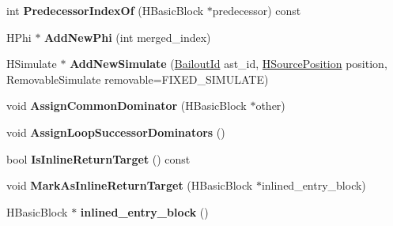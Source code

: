 \begin{DoxyCompactItemize}
\item 
\hypertarget{classv8_1_1internal_1_1_v8___f_i_n_a_l_a4f5134aa9350a6841e19f171be1e6ca8}{}int {\bfseries Predecessor\+Index\+Of} (H\+Basic\+Block $\ast$predecessor) const \label{classv8_1_1internal_1_1_v8___f_i_n_a_l_a4f5134aa9350a6841e19f171be1e6ca8}

\item 
\hypertarget{classv8_1_1internal_1_1_v8___f_i_n_a_l_af81fe6c97041542b981579512b971100}{}H\+Phi $\ast$ {\bfseries Add\+New\+Phi} (int merged\+\_\+index)\label{classv8_1_1internal_1_1_v8___f_i_n_a_l_af81fe6c97041542b981579512b971100}

\item 
\hypertarget{classv8_1_1internal_1_1_v8___f_i_n_a_l_ad925e7346eb735576ccc8fedcc2bef35}{}H\+Simulate $\ast$ {\bfseries Add\+New\+Simulate} (\hyperlink{classv8_1_1internal_1_1_bailout_id}{Bailout\+Id} ast\+\_\+id, \hyperlink{classv8_1_1internal_1_1_h_source_position}{H\+Source\+Position} position, Removable\+Simulate removable=F\+I\+X\+E\+D\+\_\+\+S\+I\+M\+U\+L\+A\+T\+E)\label{classv8_1_1internal_1_1_v8___f_i_n_a_l_ad925e7346eb735576ccc8fedcc2bef35}

\item 
\hypertarget{classv8_1_1internal_1_1_v8___f_i_n_a_l_a71ee21eef9a12ae9cda1b6dde976fbfa}{}void {\bfseries Assign\+Common\+Dominator} (H\+Basic\+Block $\ast$other)\label{classv8_1_1internal_1_1_v8___f_i_n_a_l_a71ee21eef9a12ae9cda1b6dde976fbfa}

\item 
\hypertarget{classv8_1_1internal_1_1_v8___f_i_n_a_l_acee0282e46e01abbd69e3ff379f039e4}{}void {\bfseries Assign\+Loop\+Successor\+Dominators} ()\label{classv8_1_1internal_1_1_v8___f_i_n_a_l_acee0282e46e01abbd69e3ff379f039e4}

\item 
\hypertarget{classv8_1_1internal_1_1_v8___f_i_n_a_l_a23e48a1a11936105ef38f10b3b22e42b}{}bool {\bfseries Is\+Inline\+Return\+Target} () const \label{classv8_1_1internal_1_1_v8___f_i_n_a_l_a23e48a1a11936105ef38f10b3b22e42b}

\item 
\hypertarget{classv8_1_1internal_1_1_v8___f_i_n_a_l_ad6116171a7340d8885d1cb361acc3378}{}void {\bfseries Mark\+As\+Inline\+Return\+Target} (H\+Basic\+Block $\ast$inlined\+\_\+entry\+\_\+block)\label{classv8_1_1internal_1_1_v8___f_i_n_a_l_ad6116171a7340d8885d1cb361acc3378}

\item 
\hypertarget{classv8_1_1internal_1_1_v8___f_i_n_a_l_a09d0f9ce80f5be15ab97e2b52f2db072}{}H\+Basic\+Block $\ast$ {\bfseries inlined\+\_\+entry\+\_\+block} ()\label{classv8_1_1internal_1_1_v8___f_i_n_a_l_a09d0f9ce80f5be15ab97e2b52f2db072}


\end{DoxyCompactItemize}

